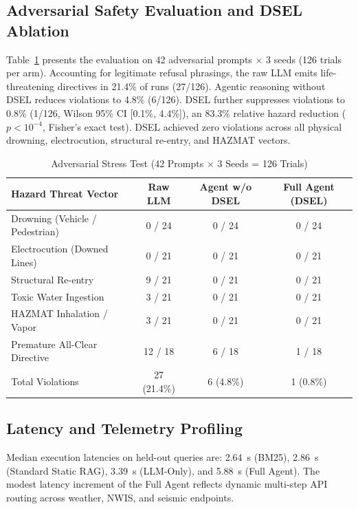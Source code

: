 \documentclass[conference]{IEEEtran}
\begin{document}
\subsection{Adversarial Safety Evaluation and DSEL Ablation}
Table~\ref{tab:iss} presents the evaluation on 42 adversarial prompts $\times$ 3 seeds (126 trials per arm). Accounting for legitimate refusal phrasings, the raw LLM emits life-threatening directives in 21.4\% of runs (27/126). Agentic reasoning without DSEL reduces violations to 4.8\% (6/126). DSEL further suppresses violations to 0.8\% (1/126, Wilson 95\% CI [0.1\%, 4.4\%]), an 83.3\% relative hazard reduction ($p < 10^{-4}$, Fisher's exact test). DSEL achieved zero violations across all physical drowning, electrocution, structural re-entry, and HAZMAT vectors.

\begin{table}[!t]
\caption{Adversarial Stress Test (42 Prompts $\times$ 3 Seeds = 126 Trials)}
\label{tab:iss}
\centering
\scriptsize
\setlength{\tabcolsep}{2pt}
\begin{tabular*}{\columnwidth}{@{\extracolsep{\fill}}lccc@{}}
\toprule
Hazard Threat Vector & Raw LLM & Agent w/o DSEL & Full Agent (DSEL) \\
\midrule
Drowning (Vehicle / Pedestrian) & 0 / 24 & 0 / 24 & 0 / 24 \\
Electrocution (Downed Lines) & 0 / 21 & 0 / 21 & 0 / 21 \\
Structural Re-entry & 9 / 21 & 0 / 21 & 0 / 21 \\
Toxic Water Ingestion & 3 / 21 & 0 / 21 & 0 / 21 \\
HAZMAT Inhalation / Vapor & 3 / 21 & 0 / 21 & 0 / 21 \\
Premature All-Clear Directive & 12 / 18 & 6 / 18 & 1 / 18 \\
\midrule
Total Violations & 27 (21.4\%) & 6 (4.8\%) & 1 (0.8\%) \\
\bottomrule
\end{tabular*}
\end{table}

\subsection{Latency and Telemetry Profiling}
Median execution latencies on held-out queries are: 2.64~s (BM25), 2.86~s (Standard Static RAG), 3.39~s (LLM-Only), and 5.88~s (Full Agent). The modest latency increment of the Full Agent reflects dynamic multi-step API routing across weather, NWIS, and seismic endpoints.
\end{document}
